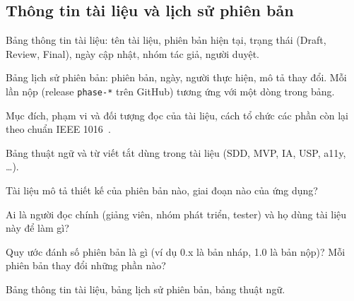 \subsection{Thông tin tài liệu và lịch sử phiên bản}
\label{sec:document-control}

\begin{guide}
\begin{compactitem}
    \item Bảng thông tin tài liệu: tên tài liệu, phiên bản hiện tại, trạng thái (Draft, Review, Final), ngày cập nhật, nhóm tác giả, người duyệt.
    \item Bảng lịch sử phiên bản: phiên bản, ngày, người thực hiện, mô tả thay đổi. Mỗi lần nộp (release \texttt{phase-*} trên GitHub) tương ứng với một dòng trong bảng.
    \item Mục đích, phạm vi và đối tượng đọc của tài liệu, cách tổ chức các phần còn lại theo chuẩn IEEE 1016~\cite{ieee1016}.
    \item Bảng thuật ngữ và từ viết tắt dùng trong tài liệu (SDD, MVP, IA, USP, a11y, \ldots).
\end{compactitem}
\begin{compactitem}
    \item Tài liệu mô tả thiết kế của phiên bản nào, giai đoạn nào của ứng dụng?
    \item Ai là người đọc chính (giảng viên, nhóm phát triển, tester) và họ dùng tài liệu này để làm gì?
    \item Quy ước đánh số phiên bản là gì (ví dụ 0.x là bản nháp, 1.0 là bản nộp)? Mỗi phiên bản thay đổi những phần nào?
\end{compactitem}
Bảng thông tin tài liệu, bảng lịch sử phiên bản, bảng thuật ngữ.
\end{guide}

